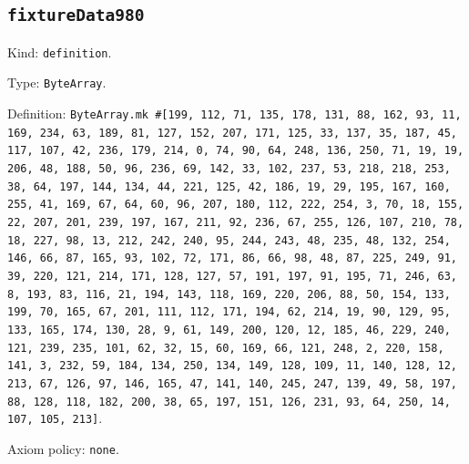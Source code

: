 \documentclass[11pt]{article}
\begin{document}
\subsection*{\texttt{fixtureData980}}
\noindent Kind: \texttt{definition}.\par
\noindent Type: \texttt{ByteArray}.\par
\noindent Definition: \texttt{ByteArray.mk \#[199, 112, 71, 135, 178, 131, 88, 162, 93, 11, 169, 234, 63, 189, 81, 127, 152, 207, 171, 125, 33, 137, 35, 187, 45, 117, 107, 42, 236, 179, 214, 0, 74, 90, 64, 248, 136, 250, 71, 19, 19, 206, 48, 188, 50, 96, 236, 69, 142, 33, 102, 237, 53, 218, 218, 253, 38, 64, 197, 144, 134, 44, 221, 125, 42, 186, 19, 29, 195, 167, 160, 255, 41, 169, 67, 64, 60, 96, 207, 180, 112, 222, 254, 3, 70, 18, 155, 22, 207, 201, 239, 197, 167, 211, 92, 236, 67, 255, 126, 107, 210, 78, 18, 227, 98, 13, 212, 242, 240, 95, 244, 243, 48, 235, 48, 132, 254, 146, 66, 87, 165, 93, 102, 72, 171, 86, 66, 98, 48, 87, 225, 249, 91, 39, 220, 121, 214, 171, 128, 127, 57, 191, 197, 91, 195, 71, 246, 63, 8, 193, 83, 116, 21, 194, 143, 118, 169, 220, 206, 88, 50, 154, 133, 199, 70, 165, 67, 201, 111, 112, 171, 194, 62, 214, 19, 90, 129, 95, 133, 165, 174, 130, 28, 9, 61, 149, 200, 120, 12, 185, 46, 229, 240, 121, 239, 235, 101, 62, 32, 15, 60, 169, 66, 121, 248, 2, 220, 158, 141, 3, 232, 59, 184, 134, 250, 134, 149, 128, 109, 11, 140, 128, 12, 213, 67, 126, 97, 146, 165, 47, 141, 140, 245, 247, 139, 49, 58, 197, 88, 128, 118, 182, 200, 38, 65, 197, 151, 126, 231, 93, 64, 250, 14, 107, 105, 213]}.\par
\noindent Axiom policy: \texttt{none}.\par
\end{document}
